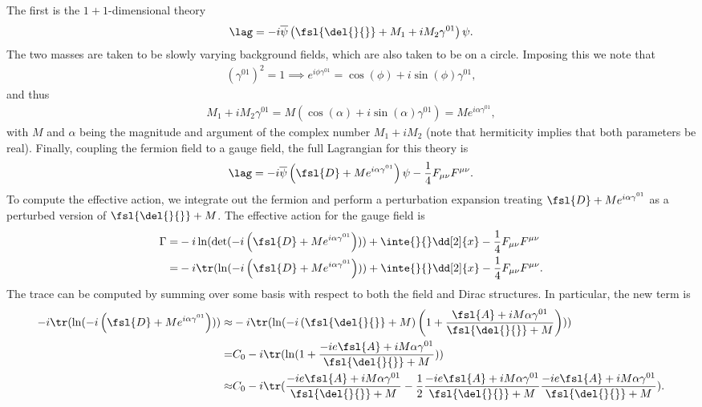 The first is the $1 + 1$-dimensional theory
\begin{align*}
	\lag = -i\overline{\psi}\left(\fsl{\del{}{}} + M_{1} + iM_{2}\gamma^{01}\right)\psi.
\end{align*}
The two masses are taken to be slowly varying background fields, which are also taken to be on a circle. Imposing this we note that
\begin{align*}
	(\gamma^{01})^{2} = 1 \implies e^{i\phi\gamma^{01}} = \cos(\phi) + i\sin(\phi)\gamma^{01},
\end{align*}
and thus
\begin{align*}
	M_{1} + iM_{2}\gamma^{01} = M\left(\cos(\alpha) + i\sin(\alpha)\gamma^{01}\right) = Me^{i\alpha\gamma^{01}},
\end{align*}
with $M$ and $\alpha$ being the magnitude and argument of the complex number $M_{1} + iM_{2}$ (note that hermiticity implies that both parameters be real). Finally, coupling the fermion field to a gauge field, the full Lagrangian for this theory is
\begin{align*}
	\lag = -i\overline{\psi}\left(\fsl{D} + Me^{i\alpha\gamma^{01}}\right)\psi - \frac{1}{4}F_{\mu\nu}F^{\mu\nu}.
\end{align*}
To compute the effective action, we integrate out the fermion and perform a perturbation expansion treating $\fsl{D} + Me^{i\alpha\gamma^{01}}$ as a perturbed version of $\fsl{\del{}{}} + M$. The effective action for the gauge field is
\begin{align*}
	\Gamma =& -i\ln(\det(-i\left(\fsl{D} + Me^{i\alpha\gamma^{01}}\right))) + \inte{}{}\dd[2]{x}-\frac{1}{4}F_{\mu\nu}F^{\mu\nu} \\
	       =& -i\tr(\ln(-i\left(\fsl{D} + Me^{i\alpha\gamma^{01}}\right))) + \inte{}{}\dd[2]{x}-\frac{1}{4}F_{\mu\nu}F^{\mu\nu}.
\end{align*}
The trace can be computed by summing over some basis with respect to both the field and Dirac structures. In particular, the new term is
\begin{align*}
	-i\tr(\ln(-i\left(\fsl{D} + Me^{i\alpha\gamma^{01}}\right))) \approx& 	-i\tr(\ln(-i\left(\fsl{\del{}{}} + M\right)\left(1 + \frac{\fsl{A} + iM\alpha\gamma^{01}}{\fsl{\del{}{}} + M}\right))) \\
	=& C_{0} - i\tr(\ln(1 + \frac{-ie\fsl{A} + iM\alpha\gamma^{01}}{\fsl{\del{}{}} + M})) \\
	\approx& C_{0} - i\tr(\frac{-ie\fsl{A} + iM\alpha\gamma^{01}}{\fsl{\del{}{}} + M} - \frac{1}{2}\frac{-ie\fsl{A} + iM\alpha\gamma^{01}}{\fsl{\del{}{}} + M}\frac{-ie\fsl{A} + iM\alpha\gamma^{01}}{\fsl{\del{}{}} + M}).
\end{align*}
